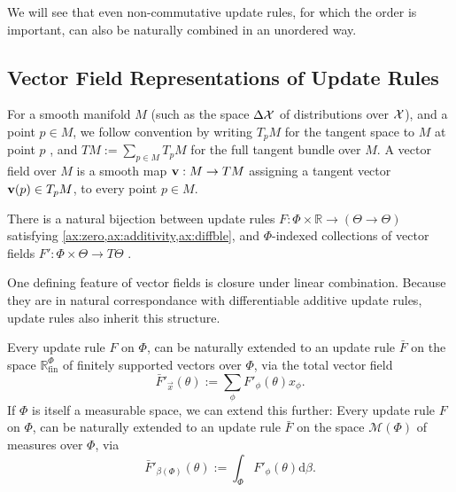 \documentclass{article}
\begin{document}
We will see that even non-commutative update rules, for which the order is important, can also be naturally combined in an unordered way.

\subsection{Vector Field Representations of Update Rules}
    \label{sec:vecrep}
For a smooth manifold $M$
(such as the space $\Delta \mathcal X$ of distributions over $\mathcal X$),
and a point $p \in M$, we follow convention by writing $T_p M$ for the tangent space to $M$ at point $p$ \parencite{lee2013smooth}, and %
$TM := \sum_{p \in M} T_p M$ for the full tangent bundle over $M$.
%
A vector field over $M$ is a smooth map $\mathbf{v} : M \to T M$ assigning a tangent vector $\mathbf{v}(p) \in T_p M$, to every point $p \in M$.

\begin{theorem}\label{thm:vecrep}
    There is a natural bijection between
    update rules $F : \Phi \times \mathbb R \to (\Theta  \to \Theta)$
        satisfying \cref{ax:zero,ax:additivity,ax:diffble},
    and $\Phi$-indexed collections of vector fields
        $ F' :  \Phi \times \Theta \to T \Theta$%
    .
\end{theorem}

One defining feature of vector fields is closure under linear
    combination.
Because they are in natural correspondance with differentiable additive update rules, update rules also inherit this structure.

\begin{prop}
    Every  update rule $F$ on $\Phi$, can be naturally extended to an update rule
    $\bar F$ on
    the space $\mathbb R^{\Phi}_{\mathrm{fin}}$ of finitely supported vectors over $\Phi$,
    via the total vector field
    \[
        \bar F'_{\vec{x}}( \theta ) := \sum_{\phi} F'_\phi(\theta) x_\phi.
    \]
%
If $\Phi$ is itself a measurable space, we can extend this further:
    Every  update rule $F$ on $\Phi$, can be naturally extended to an update rule
    $\bar F$ on
    the space $\mathcal M(\Phi)$ of measures over $\Phi$,
    via
    \[
        \bar F'_{\beta(\Phi)}( \theta ) := \int_{\Phi} F'_\phi(\theta) \mathrm d\beta.
    \]
\end{prop}
\end{document}
